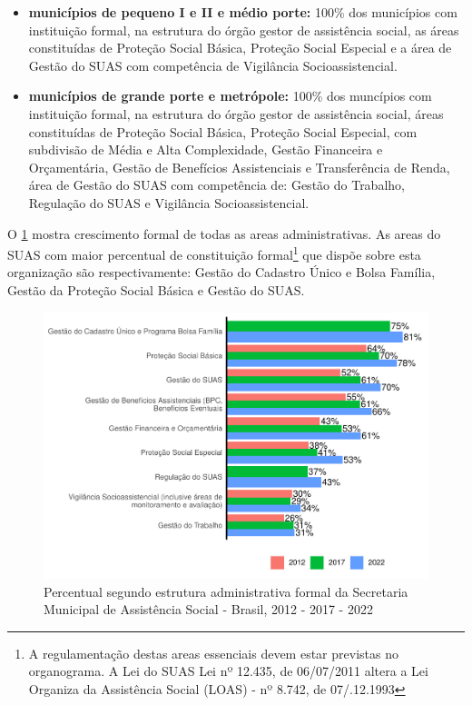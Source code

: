 \documentclass[
  brazilian]{report}
\begin{document}
\begin{itemize}
\item
  \textbf{municípios de pequeno I e II e médio porte:} 100\% dos
  municípios com instituição formal, na estrutura do órgão gestor de
  assistência social, as áreas constituídas de Proteção Social Básica,
  Proteção Social Especial e a área de Gestão do SUAS com competência de
  Vigilância Socioassistencial.
\item
  \textbf{municípios de grande porte e metrópole:} 100\% dos muncípios
  com instituição formal, na estrutura do órgão gestor de assistência
  social, áreas constituídas de Proteção Social Básica, Proteção Social
  Especial, com subdivisão de Média e Alta Complexidade, Gestão
  Financeira e Orçamentária, Gestão de Benefícios Assistenciais e
  Transferência de Renda, área de Gestão do SUAS com competência de:
  Gestão do Trabalho, Regulação do SUAS e Vigilância Socioassistencial.
\end{itemize}

O \cref{fig:munic_sub} mostra crescimento formal de todas as areas
administrativas. As areas do SUAS com maior percentual de constituição
formal\footnote{A regulamentação destas areas essenciais devem estar previstas no organograma. A Lei do SUAS Lei nº 12.435, de 06/07/2011 altera a Lei Organiza da Assistência Social (LOAS) - nº 8.742, de 07/.12.1993}
que dispõe sobre esta organização são respectivamente: Gestão do
Cadastro Único e Bolsa Família, Gestão da Proteção Social Básica e
Gestão do SUAS.

\begin{figure}
\includegraphics{Censo-SUAS-2022_files/figure-latex/munic_sub-1} \caption[Percentual segundo estrutura administrativa formal da Secretaria Municipal de Assistência Social - Brasil, 2012 - 2017 - 2022]{Percentual segundo estrutura administrativa formal da Secretaria Municipal de Assistência Social - Brasil, 2012 - 2017 - 2022}\label{fig:munic_sub}
\end{figure}
\end{document}
